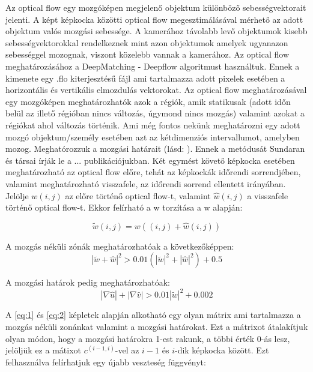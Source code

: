 \documentclass[12pt, a4paper, oneside]{book}
\theoremstyle{tetel}
\begin{document}
Az optical flow egy mozgóképen megjelenő objektum különböző sebességvektorait jelenti. A képt képkocka közötti optical flow megesztimálásával mérhető az adott objektum valós mozgási sebessége. A kamerához távolabb levő objektumok kisebb sebességvektorokkal rendelkeznek mint azon objektumok amelyek ugyanazon sebességgel mozognak, viszont közelebb vannak a kamerához\cite{34}.
Az optical flow meghatározásához a DeepMatching - Deepflow algoritmust használtuk. Ennek a kimenete egy .flo kiterjesztésű fájl ami tartalmazza adott pixelek esetében a horizontális és vertikális elmozdulás vektorokat.
\newline
\indent
Az optical flow meghatározásával egy mozgóképen meghatározhatók azok a régiók, amik statikusak (adott időn belül az illető régióban nincs változás, úgymond nincs mozgás) valamint azokat a régiókat ahol változás történik. Ami még fontos nekünk meghatározni egy adott mozgó objektum/személy esetében azt az kétdimenziós intervallumot, amelyben mozog. Meghatórozzuk a mozgási határait (lásd: ). Ennek a metódusát Sundaran és társai írják le a ... publikációjukban.
\newline
\indent
Két egymést követő képkocka esetében meghatározható az optical flow előre, tehát az képkockák időrendi sorrendjében, valamint meghatározható visszafele, az időrendi sorrend ellentett irányában. Jelölje \(w(i, j)\) az előre történő optical flow-t, valamint \(\hat{w}(i, j)\) a visszafele történő optical flow-t. Ekkor felírható a w torzítása a w alapján:

\begin{equation}
\tilde{w}(i, j) = w((i, j) + \hat{w}(i, j))
\end{equation}

A mozgás néküli zónák meghatározhatóak a következőképpen:
\begin{equation} \label{eq:1}
|\tilde{w} + \hat{w}|^2 > 0.01(|\tilde{w}|^2 + |\hat{w}|^2) + 0.5
\end{equation}

A mozgási határok pedig meghatározhatóak:
\begin{equation} \label{eq:2}
|\nabla\hat{u}| + |\nabla\hat{v}| > 0.01|\tilde{w}|^2 + 0.002
\end{equation}

A \ref{eq:1} és \ref{eq:2} képletek alapján alkotható egy olyan mátrix ami tartalmazza a mozgás néküli zonánkat valamint a mozgási határokat. Ezt a mátrixot átalakítjuk olyan módon, hogy a mozgási határokra 1-est rakunk, a többi érték 0-ás lesz, jelöljük ez a mátixot \(c^{(i-1,i)}\)-vel az \(i-1\) és \(i\)-dik képkocka között. Ezt felhasználva felírhatjuk egy újabb veszteség függvényt: 
\end{document}
